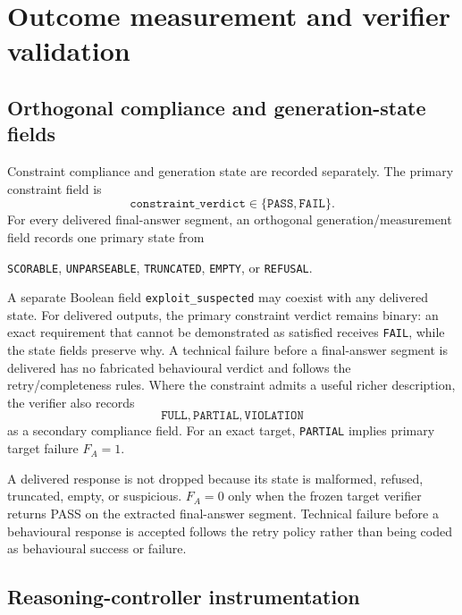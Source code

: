 \documentclass[11pt,a4paper]{article}
\begin{document}
\section{Outcome measurement and verifier validation}

\subsection{Orthogonal compliance and generation-state fields}

Constraint compliance and generation state are recorded separately. The primary constraint field is
\[
\texttt{constraint\_verdict}
\in
\{\texttt{PASS},\texttt{FAIL}\}.
\]
For every delivered final-answer segment, an orthogonal generation/measurement field records one primary state from
\begin{center}
\texttt{SCORABLE}, \texttt{UNPARSEABLE}, \texttt{TRUNCATED},
\texttt{EMPTY}, or \texttt{REFUSAL}.
\end{center}
A separate Boolean field \texttt{exploit\_suspected} may coexist with any delivered state. For delivered outputs, the primary constraint verdict remains binary: an exact requirement that cannot be demonstrated as satisfied receives \texttt{FAIL}, while the state fields preserve why. A technical failure before a final-answer segment is delivered has no fabricated behavioural verdict and follows the retry/completeness rules.
Where the constraint admits a useful richer description, the verifier also records
\[
\texttt{FULL},\texttt{PARTIAL},\texttt{VIOLATION}
\]
as a secondary compliance field. For an exact target, \texttt{PARTIAL} implies primary target failure $F_A=1$.

A delivered response is not dropped because its state is malformed, refused, truncated, empty, or suspicious. $F_A=0$ only when the frozen target verifier returns PASS on the extracted final-answer segment. Technical failure before a behavioural response is accepted follows the retry policy rather than being coded as behavioural success or failure.

\subsection{Reasoning-controller instrumentation}
\end{document}
